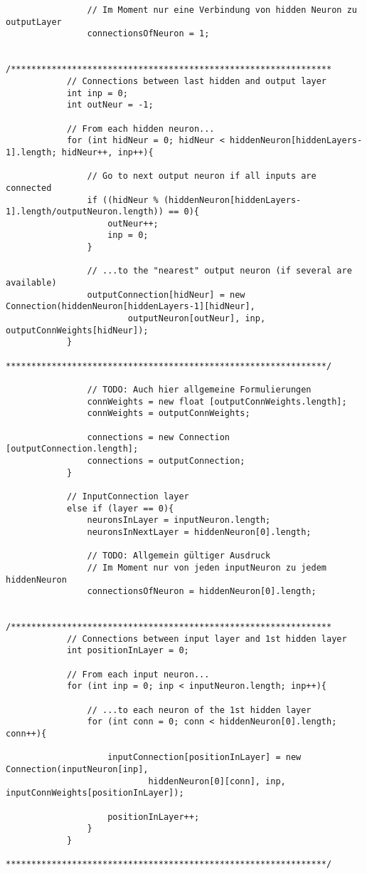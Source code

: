 \begin{lstlisting}
				// Im Moment nur eine Verbindung von hidden Neuron zu outputLayer
				connectionsOfNeuron = 1;
				
			/***************************************************************
			// Connections between last hidden and output layer
			int inp = 0;
			int outNeur = -1;
				
			// From each hidden neuron...
			for (int hidNeur = 0; hidNeur < hiddenNeuron[hiddenLayers-1].length; hidNeur++, inp++){
					
				// Go to next output neuron if all inputs are connected
				if ((hidNeur % (hiddenNeuron[hiddenLayers-1].length/outputNeuron.length)) == 0){
					outNeur++;
					inp = 0;
				}
					
				// ...to the "nearest" output neuron (if several are available)
				outputConnection[hidNeur] = new Connection(hiddenNeuron[hiddenLayers-1][hidNeur],
						outputNeuron[outNeur], inp, outputConnWeights[hidNeur]);
			}
			***************************************************************/
			
				// TODO: Auch hier allgemeine Formulierungen
				connWeights = new float [outputConnWeights.length];
				connWeights = outputConnWeights;
				
				connections = new Connection [outputConnection.length];
				connections = outputConnection;
			}
			
			// InputConnection layer
			else if (layer == 0){
				neuronsInLayer = inputNeuron.length;
				neuronsInNextLayer = hiddenNeuron[0].length;
				
				// TODO: Allgemein gültiger Ausdruck
				// Im Moment nur von jeden inputNeuron zu jedem hiddenNeuron
				connectionsOfNeuron = hiddenNeuron[0].length;
				
			/***************************************************************
			// Connections between input layer and 1st hidden layer
			int positionInLayer = 0;
			
			// From each input neuron...
			for (int inp = 0; inp < inputNeuron.length; inp++){
			
				// ...to each neuron of the 1st hidden layer
				for (int conn = 0; conn < hiddenNeuron[0].length; conn++){
					
					inputConnection[positionInLayer] = new Connection(inputNeuron[inp],
							hiddenNeuron[0][conn], inp, inputConnWeights[positionInLayer]);
					
					positionInLayer++;
				}
			}
			***************************************************************/
			

\end{lstlisting}
